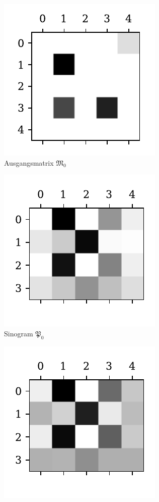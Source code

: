 \documentclass[slug=PET, room=Andreas-Schubert-Bau\,\ 424A,
supervisor=Carsten\ Bittrich, coursedate=10.\ 01.\ 2020, ngerman]{../../Lab_Report_LaTeX/lab_report}
\begin{document}
\begin{figure}[htp]
  \centering
  \begin{subfigure}[t]{.25\textwidth}
    \centering
    \includegraphics[width=.6\textwidth]{../auswertung/figs/theory/source.pdf}
    \caption{Ausgangsmatrix \(\mathfrak{M}_0\)}
    \label{fig:theory-source}
  \end{subfigure}
  \begin{subfigure}[t]{.25\textwidth}
    \centering
    \includegraphics[width=.6\textwidth]{../auswertung/figs/theory/projection.pdf}
    \caption{Sinogram \(\mathfrak{P}_0\)}
    \label{fig:theory-projection}
  \end{subfigure}
  \begin{subfigure}[t]{.25\textwidth}
    \centering
    \includegraphics[width=.6\textwidth]{../auswertung/figs/theory/convoluted.pdf}

\end{subfigure}
\end{figure}
\end{document}
